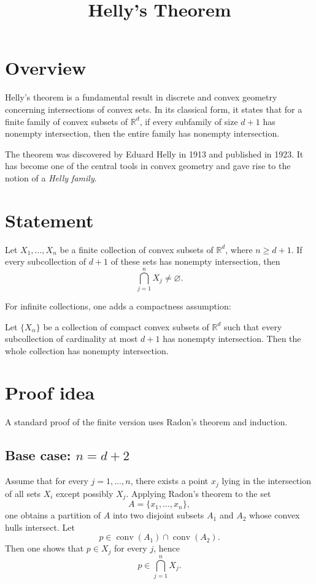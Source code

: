 \documentclass[11pt]{article}
\title{Helly's Theorem}
\author{}
\date{}
\begin{document}
\maketitle

\section*{Overview}

Helly's theorem is a fundamental result in discrete and convex geometry concerning intersections of convex sets. In its classical form, it states that for a finite family of convex subsets of $\mathbb{R}^d$, if every subfamily of size $d+1$ has nonempty intersection, then the entire family has nonempty intersection.

The theorem was discovered by Eduard Helly in 1913 and published in 1923. It has become one of the central tools in convex geometry and gave rise to the notion of a \emph{Helly family}.

\section*{Statement}

Let $X_1, \dots, X_n$ be a finite collection of convex subsets of $\mathbb{R}^d$, where $n \ge d+1$. If every subcollection of $d+1$ of these sets has nonempty intersection, then
\[
\bigcap_{j=1}^{n} X_j \neq \varnothing.
\]

For infinite collections, one adds a compactness assumption:

Let $\{X_\alpha\}$ be a collection of compact convex subsets of $\mathbb{R}^d$ such that every subcollection of cardinality at most $d+1$ has nonempty intersection. Then the whole collection has nonempty intersection.

\section*{Proof idea}

A standard proof of the finite version uses Radon's theorem and induction.

\subsection*{Base case: $n = d+2$}

Assume that for every $j = 1, \dots, n$, there exists a point $x_j$ lying in the intersection of all sets $X_i$ except possibly $X_j$. Applying Radon's theorem to the set
\[
A = \{x_1, \dots, x_n\},
\]
one obtains a partition of $A$ into two disjoint subsets $A_1$ and $A_2$ whose convex hulls intersect. Let
\[
p \in \operatorname{conv}(A_1) \cap \operatorname{conv}(A_2).
\]
Then one shows that $p \in X_j$ for every $j$, hence
\[
p \in \bigcap_{j=1}^{n} X_j.
\]
\end{document}
